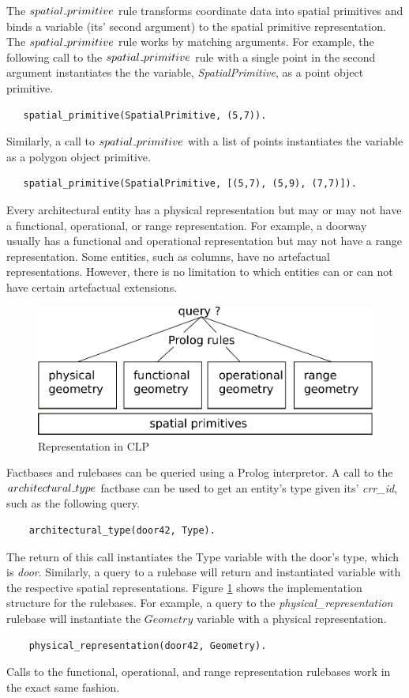 \documentclass[12pt]{ucthesis}
\begin{document}
The $spatial \mathunderscore primitive$ rule transforms coordinate data into spatial primitives and binds a variable (its' second argument) to the spatial primitive representation. The $spatial \mathunderscore primitive$ rule works by matching arguments. For example, the following call to the $spatial \mathunderscore primitive$ rule with a single point in the second argument instantiates the the variable, \emph{SpatialPrimitive}, as a point object primitive.
\begin{verbatim}
   spatial_primitive(SpatialPrimitive, (5,7)).
\end{verbatim} Similarly, a call to $spatial \mathunderscore primitive$ with a list of points instantiates the variable as a polygon object primitive.
\begin{verbatim}
   spatial_primitive(SpatialPrimitive, [(5,7), (5,9), (7,7)]).
\end{verbatim} 

Every architectural entity has a physical representation but may or may not have a functional, operational, or range representation. For example, a doorway usually has a functional and operational representation but may not have a range representation. Some entities, such as columns, have no artefactual representations. However, there is no limitation to which entities can or can not have certain artefactual extensions.

\begin{figure}[H]
\centering
\includegraphics[width=120mm]{clp-design}
\caption{Representation in CLP}
\label{clp-design}
\end{figure}

Factbases and rulebases can be queried using a Prolog interpretor. A call to the $architectural \mathunderscore type$ factbase can be used to get an entity's type given its' \emph{crr\_id}, such as the following query.
\begin{verbatim}
    architectural_type(door42, Type).
\end{verbatim} The return of this call instantiates the Type variable with the door's type, which is \emph{door}. Similarly, a query to a rulebase will return and instantiated variable with the respective spatial representations. Figure \ref{clp-design} shows the implementation structure for the rulebases. For example, a query to the \emph{physical\_representation} rulebase will instantiate the $Geometry$ variable with a physical representation. \begin{verbatim}
    physical_representation(door42, Geometry).
\end{verbatim} Calls to the functional, operational, and range representation rulebases work in the exact same fashion.
\end{document}
